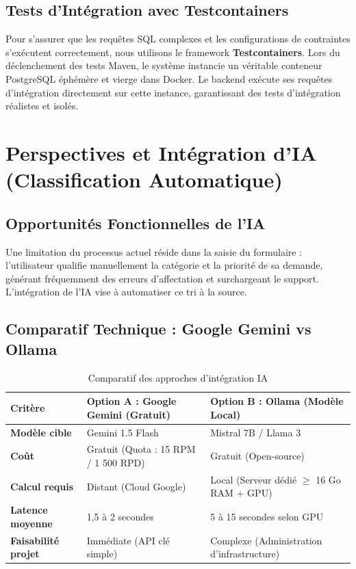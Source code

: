 \documentclass[12pt,a4paper]{article}
\begin{document}
\subsection{Tests d'Intégration avec Testcontainers}
Pour s'assurer que les requêtes SQL complexes et les configurations de contraintes s'exécutent correctement, nous utilisons le framework \textbf{Testcontainers}.
Lors du déclenchement des tests Maven, le système instancie un véritable conteneur PostgreSQL éphémère et vierge dans Docker. Le backend exécute ses requêtes d'intégration directement sur cette instance, garantissant des tests d'intégration réalistes et isolés.

\clearpage

\section{Perspectives et Intégration d'IA (Classification Automatique)}

\subsection{Opportunités Fonctionnelles de l'IA}
Une limitation du processus actuel réside dans la saisie du formulaire : l'utilisateur qualifie manuellement la catégorie et la priorité de sa demande, générant fréquemment des erreurs d'affectation et surchargeant le support. L'intégration de l'IA vise à automatiser ce tri à la source.

\subsection{Comparatif Technique : Google Gemini vs Ollama}
\begin{table}[htbp]
    \centering
    \caption{Comparatif des approches d'intégration IA}
    \label{tab:ia_compare_2}
    \vspace{0.3cm}
    \begin{tabular}{lll}
        \toprule
        \textbf{Critère} & \textbf{Option A : Google Gemini (Gratuit)} & \textbf{Option B : Ollama (Modèle Local)} \\
        \midrule
        \textbf{Modèle cible} & Gemini 1.5 Flash & Mistral 7B / Llama 3 \\
        \textbf{Coût} & Gratuit (Quota : 15 RPM / 1 500 RPD) & Gratuit (Open-source) \\
        \textbf{Calcul requis} & Distant (Cloud Google) & Local (Serveur dédié $\ge$ 16 Go RAM + GPU) \\
        \textbf{Latence moyenne} & 1,5 à 2 secondes & 5 à 15 secondes selon GPU \\
        \textbf{Faisabilité projet} & Immédiate (API clé simple) & Complexe (Administration d'infrastructure) \\
        \bottomrule
    \end{tabular}
\end{table}
\end{document}
